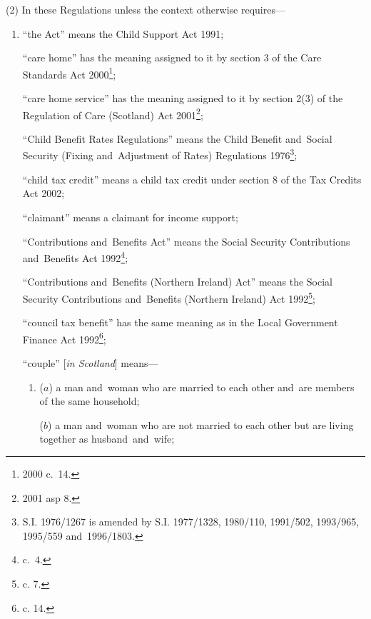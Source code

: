 \documentclass[12pt,a4paper]{article}
\begin{document}
(2) In these Regulations unless the context otherwise requires—
\begin{enumerate}\item[]
“the Act” means the Child Support Act 1991;

“care home” has the meaning assigned to it by section 3 of the Care Standards Act 2000\footnote{2000 c.\ 14.};

“care home service” has the meaning assigned to it by section 2(3) of the Regulation of Care (Scotland) Act 2001\footnote{2001 asp 8.};

“Child Benefit Rates Regulations” means the Child Benefit and~Social Security (Fixing and~Adjustment of Rates) Regulations 1976\footnote{\frenchspacing S.I. 1976/1267 is amended by S.I. 1977/1328, 1980/110, 1991/502, 1993/965, 1995/559 and~1996/1803.};

“child tax credit” means a child tax credit under section 8 of the Tax Credits Act 2002;

“claimant” means a claimant for income support;

“Contributions and~Benefits Act” means the Social Security Contributions and~Benefits Act 1992\footnote{ c.~4.};

“Contributions and~Benefits (Northern Ireland) Act” means the Social Security Contributions and~Benefits (Northern Ireland) Act 1992\footnote{ c. 7.};

“council tax benefit” has the same meaning as in the Local Government Finance Act 1992\footnote{ c. 14.};


“couple” [\emph{in Scotland}] means—
\begin{enumerate}\item[]
($a$) 
a man and~woman who are married to each other and~are members of the same household;

($b$) 
a man and~woman who are not married to each other but are living together as husband~and~wife;


\end{enumerate}
\end{enumerate}
\end{document}
